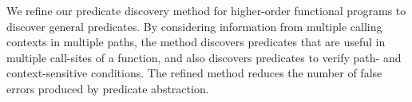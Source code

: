 \begin{enumerate}
      We refine our predicate discovery method for higher-order
      functional programs to discover general predicates.  By
      considering information from multiple calling contexts in multiple
      paths, the method discovers predicates that are useful in multiple
      call-sites of a function, and also discovers predicates to verify
      path- and context-sensitive conditions.  The refined method
      reduces the number of false errors produced by predicate
      abstraction.




\end{enumerate}
